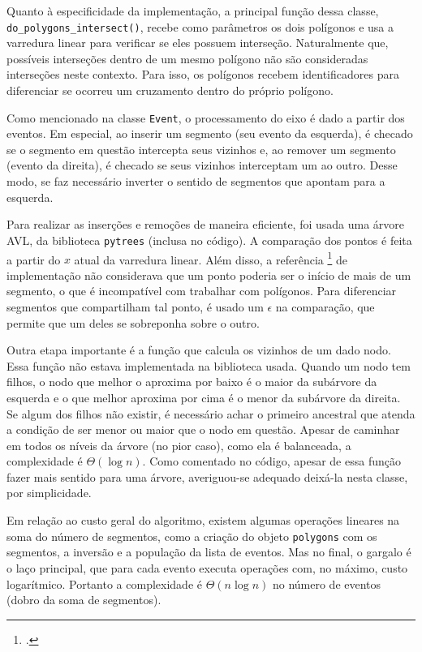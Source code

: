 \documentclass{article}
\begin{document}
Quanto à especificidade da implementação, a principal função dessa classe, \texttt{do\_polygons\_intersect()}, recebe como parâmetros os dois polígonos e usa a varredura linear para verificar se eles possuem interseção. Naturalmente que, possíveis interseções dentro de um mesmo polígono não são consideradas interseções neste contexto. Para isso, os polígonos recebem identificadores para diferenciar se ocorreu um cruzamento dentro do próprio polígono.

Como mencionado na classe \texttt{Event}, o processamento do eixo é dado a partir dos eventos. Em especial, ao inserir um segmento (seu evento da esquerda), é checado se o segmento em questão intercepta seus vizinhos e, ao remover um segmento (evento da direita), é checado se seus vizinhos interceptam um ao outro. Desse modo, se faz necessário inverter o sentido de segmentos que apontam para a esquerda.

Para realizar as inserções e remoções de maneira eficiente, foi usada uma árvore AVL, da biblioteca \texttt{pytrees} (inclusa no código). A comparação dos pontos é feita a partir do \( x \) atual da varredura linear. Além disso, a referência \footcite{SL18} de implementação não considerava que um ponto poderia ser o início de mais de um segmento, o que é incompatível com trabalhar com polígonos. Para diferenciar segmentos que compartilham tal ponto, é usado um \( \epsilon \) na comparação, que permite que um deles se sobreponha sobre o outro.

Outra etapa importante é a função que calcula os vizinhos de um dado nodo. Essa função não estava implementada na biblioteca usada. Quando um nodo tem filhos, o nodo que melhor o aproxima por baixo é o maior da subárvore da esquerda e o que melhor aproxima por cima é o menor da subárvore da direita. Se algum dos filhos não existir, é necessário achar o primeiro ancestral que atenda a condição de ser menor ou maior que o nodo em questão. Apesar de caminhar em todos os níveis da árvore (no pior caso), como ela é balanceada, a complexidade é \( \Theta(\log n) \). Como comentado no código, apesar de essa função fazer mais sentido para uma árvore, averiguou-se adequado deixá-la nesta classe, por simplicidade.

Em relação ao custo geral do algoritmo, existem algumas operações lineares na soma do número de segmentos, como a criação do objeto \texttt{polygons} com os segmentos, a inversão e a população da lista de eventos. Mas no final, o gargalo é o laço principal, que para cada evento executa operações com, no máximo, custo logarítmico. Portanto a complexidade é \( \Theta(n \log n) \) no número de eventos (dobro da soma de segmentos).
\end{document}
